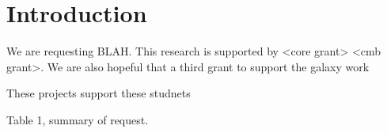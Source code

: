 \section{Introduction}

We are requesting BLAH.
This research is supported by <core grant> <cmb grant>.  We are also hopeful
that a third grant to support the galaxy work

These projects support these studnets   

Table 1, summary of request.

